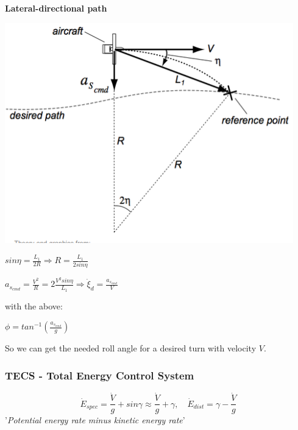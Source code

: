 \documentclass[fontsize=6pt,DIV=calc,a4paper,ngerman]{scrartcl}
\begin{document}
\begin{multicols*}{4}
	\textbf{Lateral-directional path}\\
	\begin{minipage}{0.4\linewidth}
		\includegraphics[width=\linewidth]{lateral.png}
	\end{minipage}
	\begin{minipage}{0.6\linewidth}
		$sin\eta = \frac{L_1}{2R} \Rightarrow R= \frac{L_1}{2sin\eta}$

		$a_{s_{cmd}}= \frac{V^2}{R}= 2\frac{V^2sin\eta}{L_1} \Rightarrow \dot{\xi}_d=\frac{a_{s_{cmd}}}{V}$

		\smallskip
		with the above:

		$\displaystyle \phi = tan^{-1}\left(\frac{a_{s_{cmd}}}{g}\right)$

		So we can get the needed roll angle for a desired turn with velocity $V$.
	\end{minipage}


	\subsubsection{TECS - Total Energy Control System}

	$$\dot{E}_{spec}= \frac{\dot{V}}{g}+sin\gamma \approx \frac{\dot{V}}{g}+\gamma, \quad \dot{E}_{dist} = \gamma - \frac{\dot{V}}{g}
	$$
	'\textit{Potential energy rate minus kinetic energy rate}'






\end{multicols*}
\end{document}
